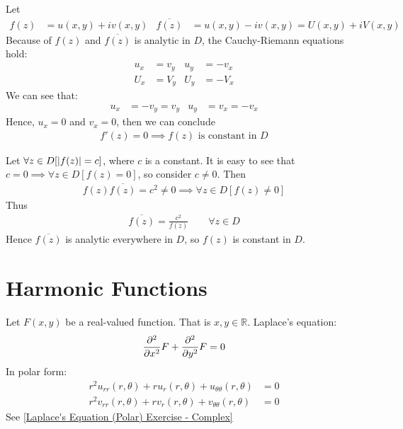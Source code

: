 \documentclass[12pt, english]{book}
\begin{document}
	\begin{example}
		Let 
		\begin{align*}
			f(z) &= u(x,y) + iv(x,y) & \overline{f(z)} &= u(x,y) - iv(x,y) = U(x,y) + iV(x,y)
		\end{align*}
		Because of \(f(z)\) and \(\overline{f(z)}\) is analytic in \(D\), the Cauchy-Riemann equations hold:
		\begin{align*}
			u_x &= v_y		&	u_y &= -v_x \\
			U_x &= V_y		&	U_y &= -V_x
		\end{align*}
		We can see that:
		\begin{align*}
			u_x &= -v_y	= v_y &	u_y &= v_x = -v_x
		\end{align*}
		Hence, \(u_x = 0\) and \(v_x = 0\), then we can conclude
		\begin{align*}
			f'(z) = 0 \implies f(z) \text{ is constant in } D
		\end{align*}
	\end{example}

	\begin{example}
		Let \(\forall z \in D[\abs{f(z)} = c]\), where \(c\) is a constant. It is easy to see that \(c = 0 \implies \forall z \in D[f(z) = 0]\), so consider \(c \neq 0\). Then
		\begin{align*}
			f(z)\overline{f(z)} = c^2 \neq 0 \implies \forall z \in D[f(z) \neq 0]
		\end{align*}
		Thus
		\begin{align*}
			\overline{f(z)} = \frac{c^2}{f(z)} \qquad \forall z \in D
		\end{align*}
		Hence \(\overline{f(z)}\) is analytic everywhere in \(D\), so \(f(z)\) is constant in \(D\).
	\end{example}
	
	\section{Harmonic Functions} \label{Harmonic Functions - Complex}
	
	\begin{definition}
		\label{Laplace's Equation Definition - Complex}
		Let \(F(x,y)\) be a real-valued function. That is \(x,y \in \mathbb{R}\). Laplace's equation: 
		\begin{align*}
			\pdv[2]{x} F + \pdv[2]{y} F = 0
		\end{align*}
		In polar form:
		\begin{align*}
			r^2 u_{rr}(r, \theta) + ru_r(r, \theta) + u_{\theta \theta}(r, \theta) &= 0 \\
			r^2 v_{rr}(r, \theta) + rv_r(r, \theta) + v_{\theta \theta}(r, \theta) &= 0
		\end{align*}
		See \cref{Laplace's Equation (Polar) Exercise - Complex}
	\end{definition}
\end{document}
